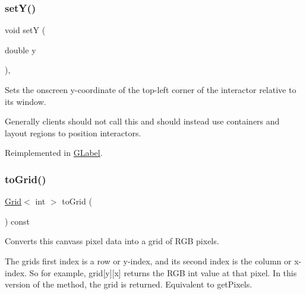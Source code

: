 \mbox{\label{classGInteractor_a7d57e2a5c35d27feb58fd498a3cf82b9}} 
\subsubsection{\texorpdfstring{set\+Y()}{setY()}}
{\footnotesize\ttfamily void setY (\begin{DoxyParamCaption}\item[{double}]{y }\end{DoxyParamCaption})\hspace{0.3cm}{\ttfamily [virtual]}, {\ttfamily [inherited]}}



Sets the onscreen y-\/coordinate of the top-\/left corner of the interactor relative to its window. 

Generally clients should not call this and should instead use containers and layout regions to position interactors. 

Reimplemented in \mbox{\hyperlink{classGLabel_a59633abb35b676c54d88ea6cd384fc55}{G\+Label}}.

\mbox{\label{classGCanvas_a2f9b15856aaf66aa95cfd7405bd972cc}} 
\subsubsection{\texorpdfstring{to\+Grid()}{toGrid()}\hspace{0.1cm}{\footnotesize\ttfamily [1/2]}}
{\footnotesize\ttfamily \mbox{\hyperlink{classGrid}{Grid}}$<$ int $>$ to\+Grid (\begin{DoxyParamCaption}{ }\end{DoxyParamCaption}) const\hspace{0.3cm}{\ttfamily [virtual]}}



Converts this canvas\textquotesingle{}s pixel data into a grid of R\+GB pixels. 

The grid\textquotesingle{}s first index is a row or y-\/index, and its second index is the column or x-\/index. So for example, grid\mbox{[}y\mbox{]}\mbox{[}x\mbox{]} returns the R\+GB int value at that pixel. In this version of the method, the grid is returned. Equivalent to get\+Pixels. \mbox{\label{classGCanvas_a11c06bec679dda1519ed914bca68900a}} 

